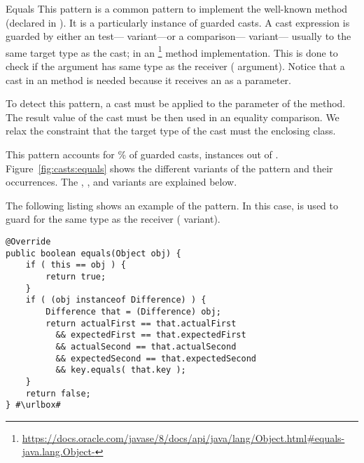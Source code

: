 \begin{pattern}{Equals}
This pattern is a common pattern to implement the well-known  method (declared in ).
It is a particularly instance of guarded casts.
A cast expression is guarded by either an
 test--- variant---or a
 comparison--- variant---
usually to the same target type as the cast;
in an %
\footnote{\url{https://docs.oracle.com/javase/8/docs/api/java/lang/Object.html\#equals-java.lang.Object-}}
method implementation.
This is done to check if the argument has same type as the receiver
( argument).
Notice that a cast in an  method is needed because it
receives an  as a parameter.

To detect this pattern,
a cast must be applied to the parameter of the  method.
The result value of the cast must be then used in an equality comparison.
We relax the constraint that the target type of the cast must the enclosing class.

\instances{}
This pattern accounts for \nEqualsOutofGuarded\% of guarded casts,
\nEqualsPattern{} instances out of \nGuarded{}.
Figure~\ref{fig:casts:equals} shows the different variants of the \thisp{} pattern and their occurrences.
The , , and
 variants are explained below.


The following listing shows an example of the \thisp{} pattern.
In this case,
 is used to guard for the same type as the receiver 
( variant).

\def\urlvar{http://bit.ly/neo4j_neo4j_2vJw94J}
\begin{verbatim}
@Override
public boolean equals(Object obj) {
    if ( this == obj ) {
        return true;
    }
    if ( (obj instanceof Difference) ) {
        Difference that = (Difference) obj;
        return actualFirst == that.actualFirst
          && expectedFirst == that.expectedFirst
          && actualSecond == that.actualSecond 
          && expectedSecond == that.expectedSecond
          && key.equals( that.key );
    }
    return false;
} #\urlbox#
\end{verbatim}


\end{pattern}
